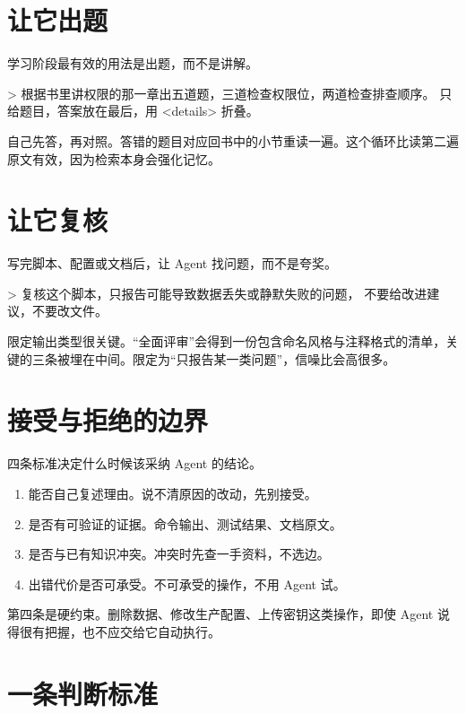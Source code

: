 \section{让它出题}

学习阶段最有效的用法是出题，而不是讲解。

\begin{shellsession}
> 根据书里讲权限的那一章出五道题，三道检查权限位，两道检查排查顺序。
  只给题目，答案放在最后，用 <details> 折叠。
\end{shellsession}

自己先答，再对照。答错的题目对应回书中的小节重读一遍。这个循环比读第二遍原文有效，因为检索本身会强化记忆。

\section{让它复核}

写完脚本、配置或文档后，让 Agent 找问题，而不是夸奖。

\begin{shellsession}
> 复核这个脚本，只报告可能导致数据丢失或静默失败的问题，
  不要给改进建议，不要改文件。
\end{shellsession}

限定输出类型很关键。“全面评审”会得到一份包含命名风格与注释格式的清单，关键的三条被埋在中间。限定为“只报告某一类问题”，信噪比会高很多。

\section{接受与拒绝的边界}

四条标准决定什么时候该采纳 Agent 的结论。

\begin{enumerate}
  \item 能否自己复述理由。说不清原因的改动，先别接受。
  \item 是否有可验证的证据。命令输出、测试结果、文档原文。
  \item 是否与已有知识冲突。冲突时先查一手资料，不选边。
  \item 出错代价是否可承受。不可承受的操作，不用 Agent 试。
\end{enumerate}

第四条是硬约束。删除数据、修改生产配置、上传密钥这类操作，即使 Agent 说得很有把握，也不应交给它自动执行。

\section{一条判断标准}

